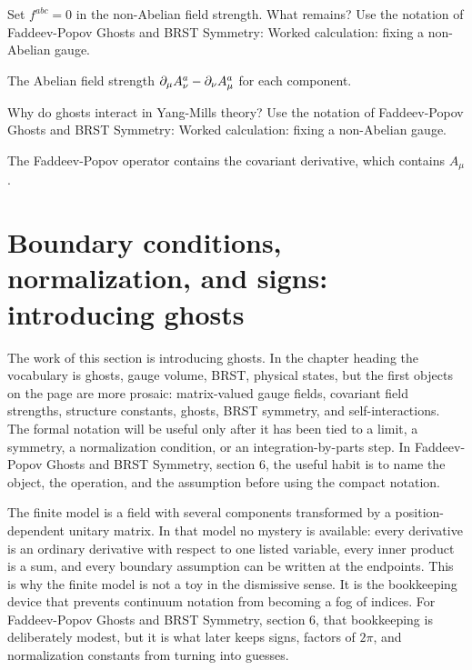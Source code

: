\begin{exercise}
Set \(f^{abc}=0\) in the non-Abelian field strength.  What remains?  Use the notation of Faddeev-Popov Ghosts and BRST Symmetry: Worked calculation: fixing a non-Abelian gauge.
\begin{answer}
The Abelian field strength \(\partial_\mu A_\nu^a-\partial_\nu A_\mu^a\) for each component.
\end{answer}
\end{exercise}

\begin{exercise}
Why do ghosts interact in Yang-Mills theory?  Use the notation of Faddeev-Popov Ghosts and BRST Symmetry: Worked calculation: fixing a non-Abelian gauge.
\begin{answer}
The Faddeev-Popov operator contains the covariant derivative, which contains \(A_\mu\).
\end{answer}
\end{exercise}



\section{Boundary conditions, normalization, and signs: introducing ghosts}

The work of this section is introducing ghosts.  In the chapter heading the vocabulary is ghosts, gauge volume, BRST, physical states, but the first objects on the page are more prosaic: matrix-valued gauge fields, covariant field strengths, structure constants, ghosts, BRST symmetry, and self-interactions.  The formal notation will be useful only after it has been tied to a limit, a symmetry, a normalization condition, or an integration-by-parts step.  In Faddeev-Popov Ghosts and BRST Symmetry, section 6, the useful habit is to name the object, the operation, and the assumption before using the compact notation.

The finite model is a field with several components transformed by a position-dependent unitary matrix.  In that model no mystery is available: every derivative is an ordinary derivative with respect to one listed variable, every inner product is a sum, and every boundary assumption can be written at the endpoints.  This is why the finite model is not a toy in the dismissive sense.  It is the bookkeeping device that prevents continuum notation from becoming a fog of indices.  For Faddeev-Popov Ghosts and BRST Symmetry, section 6, that bookkeeping is deliberately modest, but it is what later keeps signs, factors of \(2\pi\), and normalization constants from turning into guesses.

